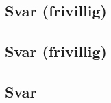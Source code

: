 \documentclass[answers,11pt]{exam}
\begin{document}
\begin{enumerate}[label=\alph*)]
  

  \begin{tcolorbox}
    \subsection*{Svar (frivillig)}

  \end{tcolorbox}

  \newpage
  

  \begin{tcolorbox}
    \subsection*{Svar (frivillig)}

  \end{tcolorbox}

  \newpage
  

  \begin{tcolorbox}
    \subsection*{Svar}


\end{tcolorbox}
\end{enumerate}
\end{document}
